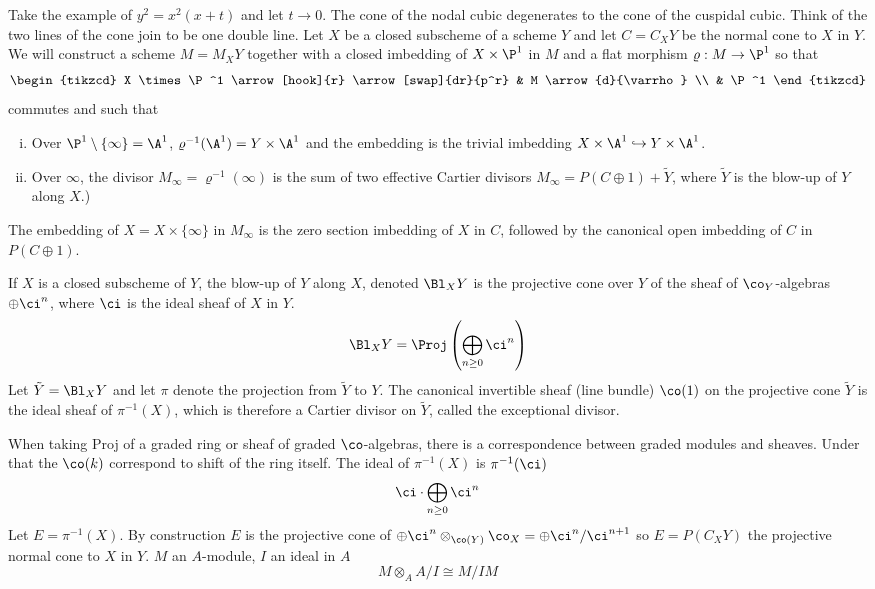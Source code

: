 Take the example of $y^2=x^2(x+t)$ and let $t \to 0$. The cone of the nodal cubic degenerates to the cone of the cuspidal cubic. Think of the two lines of the cone join to be one double line. Let $X$ be a closed subscheme of a scheme $Y$ and let $C=C_XY$ be the normal cone to $X$ in $Y$. We will construct a scheme $M=M_XY$ together with a closed imbedding of $X \times \P^1$ in $M$ and a flat morphism $\varrho: M \to \P^1$ so that
	\[
	\begin{tikzcd}
	X \times \P^1 \arrow[hook]{r} \arrow[swap]{dr}{p^r} & M \arrow{d}{\varrho} \\
	& \P^1
	\end{tikzcd}
	\]
commutes and such that 
\begin{enumerate}[(i)]
\item Over $\P^1 \setminus \{\infty\}=\A^1$, $\varrho^{-1}(\A^1)=Y \times \A^1$ and the embedding is the trivial imbedding $X \times \A^1 \hookrightarrow Y \times \A^1$.
\item Over $\infty$, the divisor $M_\infty=\varrho^{-1}(\infty)$ is the sum of two effective Cartier divisors $M_\infty=P(C\oplus 1) + \tilde{Y}$, where $\tilde{Y}$ is the blow-up of $Y$ along $X$.)
\end{enumerate}
The embedding of $X=X \times \{\infty\}$ in $M_\infty$ is the zero section imbedding of $X$ in $C$, followed by the canonical open imbedding of $C$ in $P(C \oplus 1)$. 


If $X$ is a closed subscheme of $Y$, the blow-up of $Y$ along $X$, denoted $\Bl_X Y$ is the projective cone over $Y$ of the sheaf of $\co_Y$-algebras $\oplus \ci^n$, where $\ci$ is the ideal sheaf of $X$ in $Y$.
	\[
	\Bl_X Y = \Proj\left(\bigoplus_{n \geq 0} \ci^n\right)
	\]
Let $\tilde{Y}=\Bl_X Y$ and let $\pi$ denote the projection from $\tilde{Y}$ to $Y$. The canonical invertible sheaf (line bundle) $\co(1)$ on the projective cone $\tilde{Y}$ is the ideal sheaf of $\pi^{-1}(X)$, which is therefore a Cartier divisor on $\tilde{Y}$, called the exceptional divisor. 


When taking Proj of a graded ring or sheaf of graded $\co$-algebras, there is a correspondence between graded modules and sheaves. Under that the $\co(k)$ correspond to shift of the ring itself. The ideal of $\pi^{-1}(X)$ is $\pi^{-1}(\ci)$
	\[
	\ci \cdot \bigoplus_{n \geq 0} \ci^n
	\]
Let $E=\pi^{-1}(X)$. By construction $E$ is the projective cone of $\oplus \ci^n \otimes_{\co(Y)} \co_X=\oplus \ci^n/\ci^{n+1}$ so $E=P(C_X Y)$ the projective normal cone to $X$ in $Y$. $M$ an $A$-module, $I$ an ideal in $A$
	\[
	M \otimes_A A/I \cong M/IM
	\]


